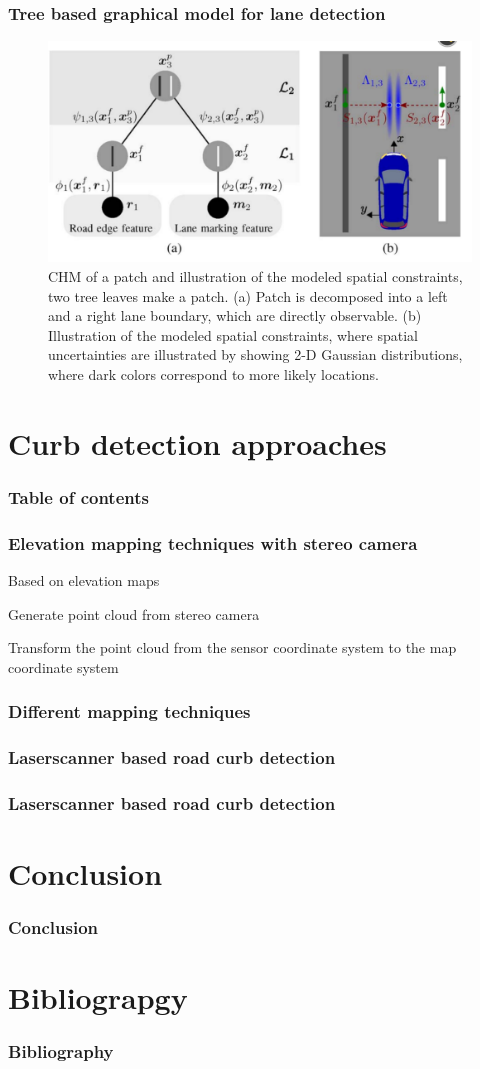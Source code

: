 \documentclass[t]{beamer}
\begin{document}
\frame
{
	\frametitle{Tree based graphical model for lane detection}


	\begin{figure}[H]
	\centering
    \includegraphics[scale = 0.25]{pictures/patch.pdf}
	\caption{CHM of a patch and illustration of the modeled spatial constraints, two tree leaves make a patch. (a) Patch is decomposed into a left and a right lane boundary, which are directly observable. (b) Illustration of the modeled spatial constraints, where spatial uncertainties are illustrated by showing 2-D Gaussian distributions, where dark colors correspond to more likely locations.}
	\label{fig11}
	\end{figure}

}



\section{Curb detection approaches}

\frame
{
	\frametitle{Table of contents}
	\tableofcontents[ 
    currentsubsection, 
    sectionstyle=show/hide, 
    subsectionstyle=show/shaded,
    sectionstyle=show/shaded 
    ] 
}

\frame
{
	\frametitle{Elevation mapping techniques with stereo camera}
	\itemize
	{
		\item Based on elevation maps
	}
	\enumerate
	{
		\item Generate point cloud from stereo camera
		\item Transform the point cloud from the sensor coordinate system to the map coordinate system
	}
}

\frame
{
	\frametitle{Different mapping techniques}

}


\frame
{
	\frametitle{Laserscanner based road curb detection}
}

\frame
{
	\frametitle{Laserscanner based road curb detection}

}

\section{Conclusion}

\frame
{
	\frametitle{Conclusion}
}

\section{Bibliograpgy}
\frame
{
	\frametitle{Bibliography}
}
\end{document}
